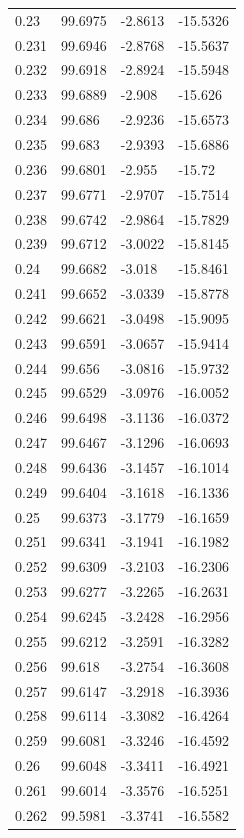 \begin{tabular}{llll}
0.23 & 99.6975 & -2.8613 & -15.5326 \\
0.231 & 99.6946 & -2.8768 & -15.5637 \\
0.232 & 99.6918 & -2.8924 & -15.5948 \\
0.233 & 99.6889 & -2.908 & -15.626 \\
0.234 & 99.686 & -2.9236 & -15.6573 \\
0.235 & 99.683 & -2.9393 & -15.6886 \\
0.236 & 99.6801 & -2.955 & -15.72 \\
0.237 & 99.6771 & -2.9707 & -15.7514 \\
0.238 & 99.6742 & -2.9864 & -15.7829 \\
0.239 & 99.6712 & -3.0022 & -15.8145 \\
0.24 & 99.6682 & -3.018 & -15.8461 \\
0.241 & 99.6652 & -3.0339 & -15.8778 \\
0.242 & 99.6621 & -3.0498 & -15.9095 \\
0.243 & 99.6591 & -3.0657 & -15.9414 \\
0.244 & 99.656 & -3.0816 & -15.9732 \\
0.245 & 99.6529 & -3.0976 & -16.0052 \\
0.246 & 99.6498 & -3.1136 & -16.0372 \\
0.247 & 99.6467 & -3.1296 & -16.0693 \\
0.248 & 99.6436 & -3.1457 & -16.1014 \\
0.249 & 99.6404 & -3.1618 & -16.1336 \\
0.25 & 99.6373 & -3.1779 & -16.1659 \\
0.251 & 99.6341 & -3.1941 & -16.1982 \\
0.252 & 99.6309 & -3.2103 & -16.2306 \\
0.253 & 99.6277 & -3.2265 & -16.2631 \\
0.254 & 99.6245 & -3.2428 & -16.2956 \\
0.255 & 99.6212 & -3.2591 & -16.3282 \\
0.256 & 99.618 & -3.2754 & -16.3608 \\
0.257 & 99.6147 & -3.2918 & -16.3936 \\
0.258 & 99.6114 & -3.3082 & -16.4264 \\
0.259 & 99.6081 & -3.3246 & -16.4592 \\
0.26 & 99.6048 & -3.3411 & -16.4921 \\
0.261 & 99.6014 & -3.3576 & -16.5251 \\
0.262 & 99.5981 & -3.3741 & -16.5582 \\

\end{tabular}
